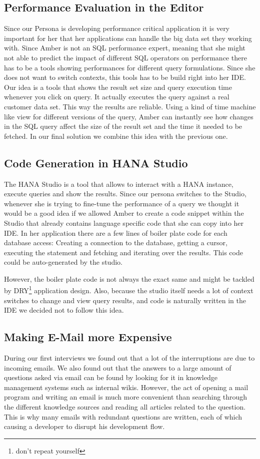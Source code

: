 \subsection{Performance Evaluation in the Editor}
Since our Persona is developing performance critical application it is very important for her that her applications can handle the big data set they working with. Since Amber is not an SQL performance expert, meaning that she might not able to predict the impact of different SQL operators on performance there has to be a tools showing performances for different query formulations. Since she does not want to switch contexts, this tools has to be build right into her IDE. Our idea is a tools that shows the result set size and query execution time whenever you click on query. It actually executes the query against a real customer data set. This way the results are reliable.
Using a kind of time machine like view for different versions of the query, Amber can instantly see how changes in the SQL query affect the size of the result set and the time it needed to be fetched.
In our final solution we combine this idea with the previous one.

\subsection{Code Generation in HANA Studio}
The HANA Studio is a tool that allows to interact with a HANA instance, execute queries and show the results. Since our persona switches to the Studio, whenever she is trying to fine-tune the performance of a query we thought it would be a good idea if we allowed Amber to create a code snippet within the Studio that already contains language specific code that she can copy into her IDE. In her application there are a few lines of boiler plate code for each database access: Creating a connection to the database, getting a cursor, executing the statement and fetching and iterating over the results. This code could be auto-generated by the studio.

However, the boiler plate code is not always the exact same and might be tackled by DRY\footnote{don't repeat yourself} application design.
Also, because the studio itself needs a lot of context switches to change and view query results, and code is naturally written in the IDE we decided not to follow this idea. 

\subsection{Making E-Mail more Expensive}
During our first interviews we found out that a lot of the interruptions are due to incoming emails. We also found out that the answers to a large amount of questions asked via email can be found by looking for it in knowledge management systems such as internal wikis. However, the act of opening a mail program and writing an email is much more convenient than searching through the different knowledge sources and reading all articles related to the question. This is why many emails with redundant questions are written, each of which causing a developer to disrupt his development flow.

